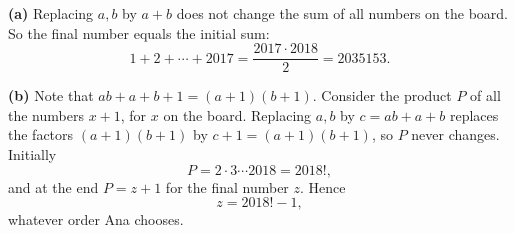 \textbf{(a)} Replacing $a,b$ by $a+b$ does not change the sum of all numbers on the board. So the final number equals the initial sum:
\[
1+2+\cdots+2017=\dfrac{2017\cdot2018}{2}=\boxed{2035153}.
\]

\textbf{(b)} Note that $ab+a+b+1=(a+1)(b+1)$. Consider the product $P$ of all the numbers $x+1$, for $x$ on the board. Replacing $a,b$ by $c=ab+a+b$ replaces the factors $(a+1)(b+1)$ by $c+1=(a+1)(b+1)$, so $P$ never changes. Initially
\[
P=2\cdot3\cdots2018=2018!,
\]
and at the end $P=z+1$ for the final number $z$. Hence
\[
z=\boxed{2018!-1},
\]
whatever order Ana chooses.
